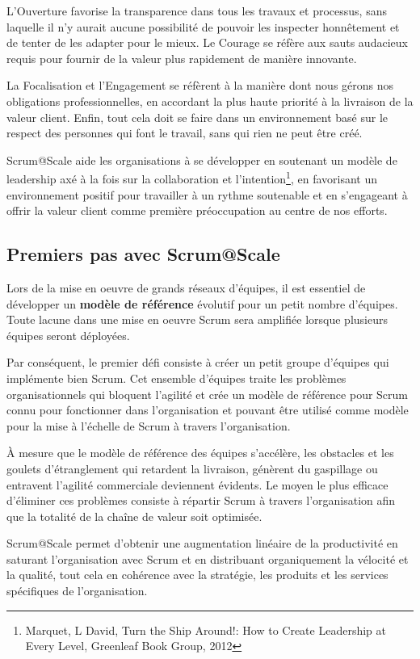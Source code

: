 \documentclass[12pt,a4paper,parskip=full]{scrartcl}
\begin{document}
L'Ouverture favorise la transparence dans tous les travaux et processus, sans laquelle il
n'y aurait aucune possibilité de pouvoir les inspecter honnêtement et de tenter de les
adapter pour le mieux. Le Courage se réfère aux sauts audacieux requis pour fournir de la
valeur plus rapidement de manière innovante.

La Focalisation et l’Engagement se réfèrent à la manière dont nous gérons nos obligations
professionnelles, en accordant la plus haute priorité à la livraison de la valeur client. Enfin,
tout cela doit se faire dans un environnement basé sur le respect des personnes qui font le
travail, sans qui rien ne peut être créé.

Scrum@Scale aide les organisations à se développer en soutenant un modèle de
leadership axé à la fois sur la collaboration et l'intention\footnote{Marquet, L
David, Turn the Ship Around!: How to Create Leadership at Every Level,
Greenleaf Book Group, 2012}, en favorisant un environnement
positif pour travailler à un rythme soutenable et en s'engageant à offrir la valeur client
comme première préoccupation au centre de nos efforts.

\subsection{Premiers pas avec Scrum@Scale}
Lors de la mise en oeuvre de grands réseaux d'équipes, il est essentiel de développer un
\textbf{modèle de référence} évolutif pour un petit nombre d'équipes. Toute lacune dans une
mise en oeuvre Scrum sera amplifiée lorsque plusieurs équipes seront déployées.

Par conséquent, le premier défi consiste à créer un petit groupe d'équipes qui implémente
bien Scrum. Cet ensemble d'équipes traite les problèmes organisationnels qui bloquent
l'agilité et crée un modèle de référence pour Scrum connu pour fonctionner dans
l'organisation et pouvant être utilisé comme modèle pour la mise à l'échelle de Scrum à
travers l'organisation.

À mesure que le modèle de référence des équipes s'accélère, les obstacles et les goulets
d'étranglement qui retardent la livraison, génèrent du gaspillage ou entravent l'agilité
commerciale deviennent évidents. Le moyen le plus efficace d'éliminer ces problèmes
consiste à répartir Scrum à travers l'organisation afin que la totalité de la chaîne de valeur
soit optimisée.

Scrum@Scale permet d’obtenir une augmentation linéaire de la productivité en saturant
l'organisation avec Scrum et en distribuant organiquement la vélocité et la qualité, tout
cela en cohérence avec la stratégie, les produits et les services spécifiques de
l'organisation.
\end{document}
